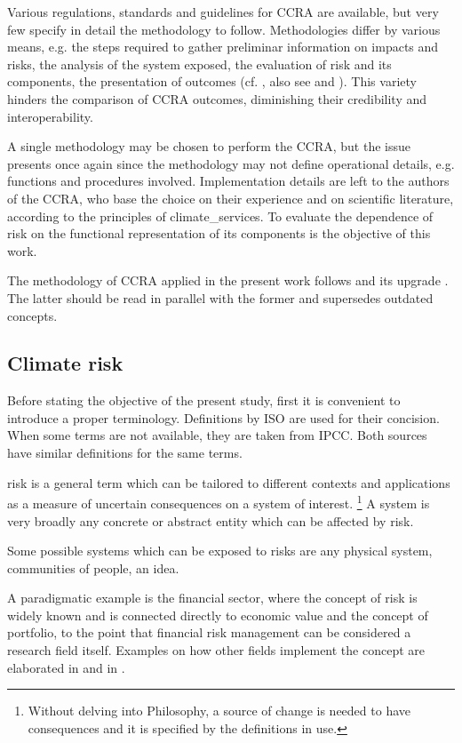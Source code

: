 Various regulations, standards and guidelines for \gls{CCRA} are available, but very few specify in detail the methodology to follow.\cite{2024LoyerInventoryOf} Methodologies differ by various means, e.g. the steps required to gather preliminar information on impacts and risks, the analysis of the system exposed, the evaluation of risk and its components, the presentation of outcomes (cf. \cite{2021ISO14091,2024EEAExecutiveSummary,2017GIZTheVulnerability,2014BowyerAdaptingTo,2024EU20212139}, also see \cite[10-11]{2024LoyerInventoryOf} and \cite[9]{2017GIZRiskSupplement}). This variety hinders the comparison of \gls{CCRA} outcomes, diminishing their credibility and interoperability.

A single methodology may be chosen to perform the \gls{CCRA}, but the issue presents once again since the methodology may not define operational details, e.g. functions and procedures involved. Implementation details are left to the authors of the \gls{CCRA}, who base the choice on their experience and on scientific literature, according to the principles of \glspl{climate_service}.
To evaluate the dependence of \gls{risk} on the functional representation of its components is the objective of this work.

The methodology of \gls{CCRA} applied in the present work follows \cite{2017GIZTheVulnerability} and its upgrade \cite{2017GIZRiskSupplement}. The latter should be read in parallel with the former and supersedes outdated concepts.



\subsection{Climate risk}
\label{sec:Climate risk}
Before stating the objective of the present study, first it is convenient to introduce a proper terminology.
Definitions by \gls{ISO} are used for their concision. When some terms are not available, they are taken from \gls{IPCC}. Both sources have similar definitions for the same terms.

\Gls{risk} is a general term which can be tailored to different contexts and applications as a measure of uncertain consequences on a system of interest.%
\footnote{Without delving into Philosophy, a source of change is needed to have consequences and it is specified by the definitions in use.}
A system is very broadly any concrete or abstract entity which can be affected by \gls{risk}.
\begin{example}
  Some possible systems which can be exposed to \glspl{risk} are any physical system, communities of people, an idea.
\end{example}
A paradigmatic example is the financial sector, where the concept of \gls{risk} is widely known and is connected directly to economic value and the concept of portfolio, to the point that financial risk management can be considered a research field itself.\cite{2004ChristoffersenElementsOf}
Examples on how other fields implement the concept are elaborated in \cite[14]{2017GIZRiskSupplement} and in \cite{2020ReisingerTheConcept}.

